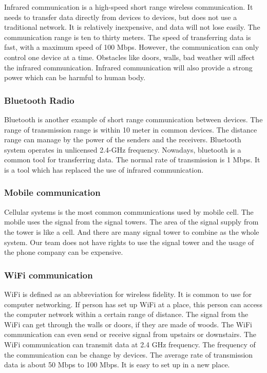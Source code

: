 \documentclass[onecolumn, draftclsnofoot,10pt, compsoc]{IEEEtran}
\begin{document}
Infrared communication is a high-speed short range wireless communication\cite{r33}. It needs to transfer data directly from devices to devices, but does not use a traditional network. It is relatively inexpensive, and data will not lose easily. The communication range is ten to thirty meters. The speed of transferring data is fast, with a maximum speed of 100 Mbps. However, the communication can only control one device at a time. Obstacles like doors, walls, bad weather will affect the infrared communication. Infrared communication will also provide a strong power which can be harmful to human body.

\subsubsection{Bluetooth Radio}
Bluetooth\cite{r22} is another example of short range communication between devices. The range of transmission range is within 10 meter in common devices. The distance range can manage by the power of the senders and the receivers. Bluetooth system operates in unlicensed 2.4-GHz frequency. Nowadays, bluetooth is a common tool for transferring data. The normal rate of transmission is 1 Mbps. It is a tool which has replaced the use of infrared communication.


\subsubsection{Mobile communication}
Cellular systems is the most common communications used by mobile cell. The mobile uses the signal from the signal towers. The area of the signal supply from the tower is like a cell. And there are many signal tower to combine as the whole system. Our team does not have rights to use the signal tower and the usage of the phone company can be expensive.

\subsubsection{WiFi communication}
WiFi is defined as an abbreviation for wireless fidelity. It is common to use for computer networking. If person has set up WiFi at a place, this person can access the computer network within a certain range of distance. The signal from the WiFi can get through the walls or doors, if they are made of woods. The WiFi communication can even send or receive signal from upstairs or downstairs. The WiFi communication can transmit data at 2.4 GHz frequency. The frequency of the communication can be change by devices. The average rate of transmission data is about 50 Mbps to 100 Mbps. It is easy to set up in a new place. 
\end{document}

